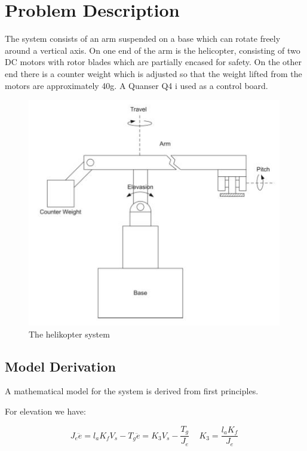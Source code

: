 \section{Problem Description}\label{sec:prob_descr}

The system consists of an arm suspended on a base which can rotate freely around a vertical axis. On one end of the arm is the helicopter, consisting of two DC motors with rotor blades which are partially encased for safety. On the other end there is a counter weight which is adjusted so that the weight lifted from the motors are approximately 40g. A Quanser Q4 i used as a control board.


\begin{figure}[H]
\includegraphics[width=1\linewidth, height=10cm]{figures/Helikopter.JPG}
\caption{The helikopter system}\label{fig:figur9}
\end{figure}

\newpage
\subsection{Model Derivation}\label{sec:mod_der}
A mathematical model for the system is derived from first principles. 

For elevation we have:

\begin{subequations}
\begin{equation}\label{eq:model_elevation1}
J_{e} \ddot{e} = l_{a} K_{f} V_{s} - T_{g}
\end{equation}

\begin{equation}\label{eq:model_elevation2}
\ddot{e} = K_{3} V_{s} - \frac{T_{g}}{J_{e}}\,\quad K_{3} = \frac{l_{a}K_{f}}{J_{e}}\
\end{equation}
\end{subequations}

